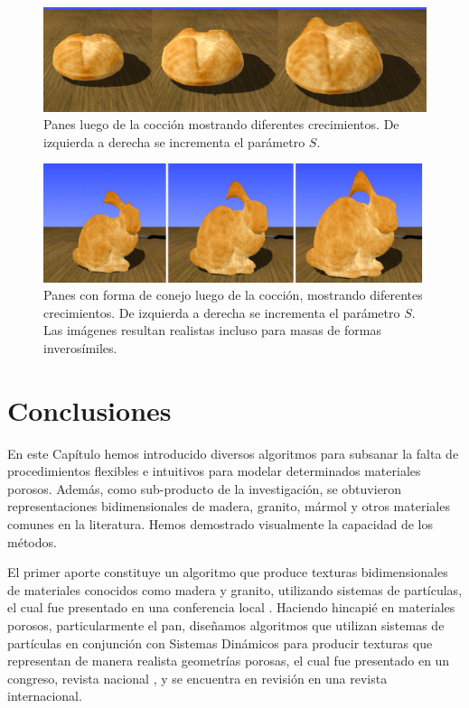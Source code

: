 \begin{figure}[!ht]
\begin{center}
\includegraphics[width=12cm]{figures/Fig14}
\caption[Panes luego de la cocción mostrando diferentes crecimientos]{Panes luego de la cocción mostrando diferentes crecimientos. De izquierda a derecha se incrementa el parámetro $S$.}
\label{fg:bakingdeform}
\end{center}
\end{figure}

\begin{figure}[!ht]
\begin{center}
\includegraphics[width=12cm]{figures/Fig15}
\caption[Panes con forma de conejo luego de la cocción, mostrando diferentes crecimientos]{Panes con forma de conejo luego de la cocción, mostrando diferentes crecimientos. De izquierda a derecha se incrementa el parámetro $S$. Las imágenes resultan realistas incluso para masas de formas inverosímiles.}
\label{fg:bakingdeform2}
\end{center}
\end{figure}


\section{Conclusiones}
En este Cap\'itulo hemos introducido diversos algoritmos para subsanar la falta de procedimientos flexibles e intuitivos para modelar determinados materiales porosos.
Además, como sub-producto de la investigación, se obtuvieron representaciones bidimensionales de madera, granito, mármol y otros materiales comunes en la literatura.
Hemos demostrado visualmente la capacidad de los métodos.

El primer aporte constituye un algoritmo que produce texturas bidimensionales de materiales conocidos como madera y granito, utilizando sistemas de partículas, el cual fue presentado en una conferencia local \cite{Baravalle2011}.
Haciendo hincapié en materiales porosos, particularmente el pan, diseñamos algoritmos que utilizan sistemas de partículas en conjunción con Sistemas Dinámicos para producir texturas que representan de manera realista geometrías porosas, el cual fue presentado en un congreso, revista nacional \cite{Baravalle2014}, y se encuentra en revisión en una revista internacional.

